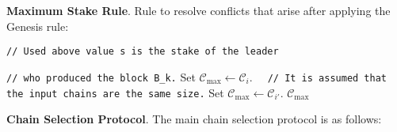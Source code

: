 \bigbreak
\noindent
{}
\textbf{Maximum Stake Rule}.\label{apndx:max-stake-rule}
Rule to resolve conflicts that arise after applying the Genesis rule:
\begin{algo}
    \caption{${\textsf{maxStakeChain}(\mathcal{C}_i}, \mathcal{C}_{i'})$}
    \begin{algorithmic}[1]

            \noindent
            \lstinline|// Used above value s is the stake of the leader|

            \noindent
            \lstinline|// who produced the block B_k.|
            \State Set ${\mathcal{C}_{\max} \leftarrow \mathcal{C}_{i}}$.
        \Else
            \noindent
            \lstinline|  // It is assumed that the input chains are the same size.|
            \State Set ${\mathcal{C}_{\max} \leftarrow \mathcal{C}_{i'}}$.
        \EndIf
        \State \Return ${\mathcal{C}_{\max}}$
    \end{algorithmic}\label{alg:max-stake-rule}
\end{algo}

\bigbreak
\bigbreak
\noindent
{}
\textbf{Chain Selection Protocol}.\label{apndx:max-selection-protocol}
The main chain selection protocol is as follows:
\begin{protocol}
    \caption{$\textsf{SelectChain}(P, \text{sid}, \mathcal{C}_{\text{loc}}, R, K_{\text{f}}, K_{\text{g}}, \mathbf{N}_0,$
        $\mathbf{S}_{\text{id}} = \{S_k^{\text{id}}\}_{k=1}^K,
        \mathbf{f}_{\text{lead}} =  \{f^{\text{lead}}_k\}_{k=1}^K,
        \mathbf{f}_{\text{cons}} = \{f^{\text{cons}}_k\}_{k=1}^K)$}
    \label{alg:max-selection-protocol}
\end{protocol}
